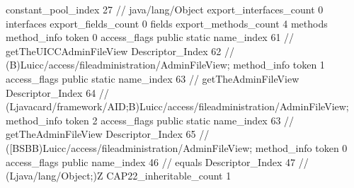 {{{{				constant_pool_index	27		// java/lang/Object
			}
			export_interfaces_count	0
			interfaces {
			}
			export_fields_count	0
			fields {
			}
			export_methods_count	4
			methods {
				method_info {
					token	0
					access_flags	public static
					name_index	61		// getTheUICCAdminFileView
					Descriptor_Index	62		// (B)Luicc/access/fileadministration/AdminFileView;
				}
				method_info {
					token	1
					access_flags	public static
					name_index	63		// getTheAdminFileView
					Descriptor_Index	64		// (Ljavacard/framework/AID;B)Luicc/access/fileadministration/AdminFileView;
				}
				method_info {
					token	2
					access_flags	public static
					name_index	63		// getTheAdminFileView
					Descriptor_Index	65		// ([BSBB)Luicc/access/fileadministration/AdminFileView;
				}
				method_info {
					token	0
					access_flags	public
					name_index	46		// equals
					Descriptor_Index	47		// (Ljava/lang/Object;)Z
				}
			}
			CAP22_inheritable_count	1
		}
	}
}
